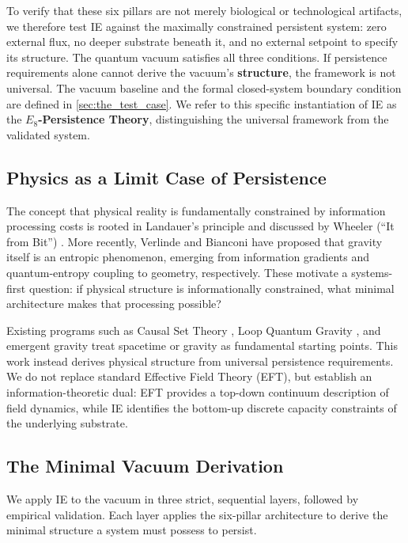 To verify that these six pillars are not merely biological or technological artifacts, we therefore test IE against the maximally constrained persistent system: zero external flux, no deeper substrate beneath it, and no external setpoint to specify its structure. The quantum vacuum satisfies all three conditions. If persistence requirements alone cannot derive the vacuum's \textbf{structure}, the framework is not universal. The vacuum baseline and the formal closed-system boundary condition are defined in \cref{sec:the_test_case}. We refer to this specific instantiation of IE as the \textbf{$E_8$-Persistence Theory}, distinguishing the universal framework from the validated system. 

\subsection{Physics as a Limit Case of Persistence}
\label{sec:context}
The concept that physical reality is fundamentally constrained by information processing costs is rooted in Landauer's principle \cite{landauer_irreversibility_1961} and discussed by Wheeler (``It from Bit'') \cite{wheeler_information_1989}. More recently, Verlinde \cite{verlinde_origin_2011} and Bianconi \cite{bianconi_thermodynamics_2025} have proposed that gravity itself is an entropic phenomenon, emerging from information gradients and quantum-entropy coupling to geometry, respectively. These motivate a systems-first question: if physical structure is informationally constrained, what minimal architecture makes that processing possible?

Existing programs such as Causal Set Theory \cite{bombelli_space-time_1987}, Loop Quantum Gravity
\cite{rovelli_quantum_2004}, and emergent gravity \cite{verlinde_origin_2011,jacobson_thermodynamics_1995} treat spacetime or gravity as fundamental starting points. This work instead derives physical structure from universal persistence requirements. We do not replace standard Effective Field Theory (EFT), but establish an information-theoretic dual: EFT provides a top-down continuum description of field dynamics, while IE identifies the bottom-up discrete capacity constraints of the underlying substrate. 

\subsection{The Minimal Vacuum Derivation}
We apply IE to the vacuum in three strict, sequential layers, followed by empirical validation. Each layer applies the six-pillar architecture to derive the minimal structure a system must possess
to persist.


